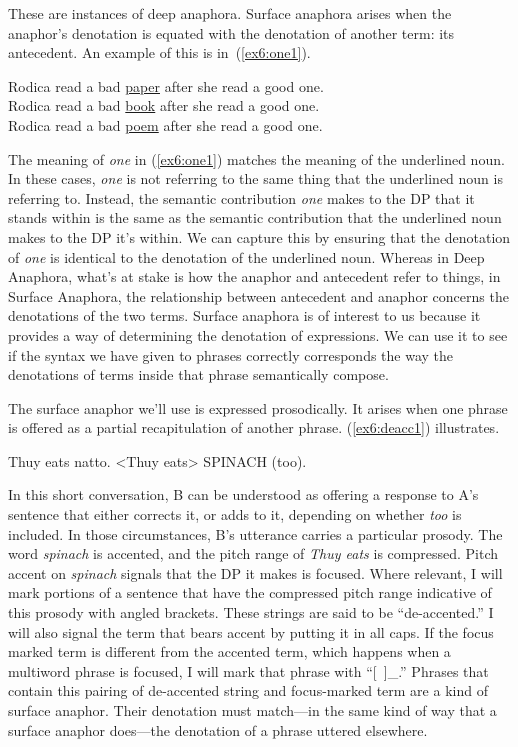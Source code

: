These are instances of deep anaphora. Surface anaphora arises when the anaphor's denotation is equated with the denotation of another term: its antecedent. An example of this is in~(\ref{ex6:one1}).
\begin{exe}
	\raggedright
	\ex \label{ex6:one1}
	Rodica read a bad \underline{paper} after she read a good one.\\ Rodica read a bad \underline{book} after she read a good one.\\ Rodica read a bad \underline{poem} after she read a good one.
\end{exe}
The meaning of \emph{one} in (\ref{ex6:one1}) matches the meaning of the underlined noun. In these cases, \emph{one} is not referring to the same thing that the underlined noun is referring to. Instead, the semantic contribution \emph{one} makes to the DP that it stands within is the same as the semantic contribution that the underlined noun makes to the DP it's within. We can capture this by ensuring that the denotation of \emph{one} is identical to the denotation of the underlined noun. Whereas in Deep Anaphora, what's at stake is how the anaphor and antecedent refer to things, in Surface Anaphora, the relationship between antecedent and anaphor concerns the denotations of the two terms. Surface anaphora is of interest to us because it provides a way of determining the denotation of expressions. We can use it to see if the syntax we have given to phrases correctly corresponds the way the denotations of terms inside that phrase semantically compose.

The surface anaphor we'll use is expressed prosodically. It arises when one phrase is offered as a partial recapitulation of another phrase. (\ref{ex6:deacc1}) illustrates.
\begin{exe}
	\raggedright
	\ex \label{ex6:deacc1}
	\begin{xlist}
		 Thuy eats natto.
		 <Thuy eats> SPINACH (too).
	\end{xlist}
\end{exe}
In this short conversation, B can be understood as offering a response to A's sentence that either corrects it, or adds to it, depending on whether \emph{too} is included. In those circumstances, B's utterance carries a particular prosody. The word \emph{spinach} is accented, and the pitch range of \emph{Thuy eats} is compressed. Pitch accent on \emph{spinach} signals that the DP it makes is focused. Where relevant, I will mark portions of a sentence that have the compressed pitch range indicative of this prosody with angled brackets. These strings are said to be ``de-accented.'' I will also signal the term that bears accent by putting it in all caps. If the focus marked term is different from the accented term, which happens when a multiword phrase is focused, I will mark that phrase with ``[~]_{}.'' Phrases that contain this pairing of de-accented string and focus-marked term are a kind of surface anaphor. Their denotation must match---in the same kind of way that a surface anaphor does---the denotation of a phrase uttered elsewhere.

